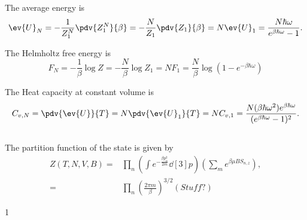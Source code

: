 \documentclass[a4paper,12pt,twoside]{article}
\newcommand{\mcols}{0}
\begin{document}
\begin{multicols*}{2}
The average energy is
\begin{equation}
	\ev{U}_N = -\frac{1}{Z_1^N} \pdv{Z_1^N}{\beta} = -\frac{N}{Z_1} \pdv{Z_1}{\beta} = N\ev{U}_1 = \frac{N\hbar\omega}{e^{\beta\hbar\omega}-1}.
\end{equation}

The Helmholtz free energy is
\begin{equation}
	F_N = -\frac{1}{\beta}\log{Z} = -\frac{N}{\beta}\log{Z_1} = NF_1 = \frac{N}{\beta} \log(1-e^{-\beta\hbar\omega})
\end{equation}

The Heat capacity at constant volume is
\begin{equation}
	C_{v,N} = \pdv{\ev{U}}{T} = N\pdv{\ev{U}_1}{T} = N C_{v,1} =  \frac{N(\beta\hbar\omega^2)e^{\beta\hbar\omega}}{(e^{\beta\hbar\omega}-1)^2}.
\end{equation}

\subsection{}

The partition function of the state is given by
\begin{align}
	Z(T,N,V,B) =& \prod_n \left(\int e^{-\frac{\beta p_n^2}{2m}}\dd[3]{p}\right)\left(\sum_m e^{\beta \mu B S_{n,z}}\right),\\
	=& \prod_n \left(\frac{2\pi m}{\beta}\right)^{3/2}\left( Stuff? \right)
\end{align}


\printBib


\if\mcols1
\end{multicols*}
\fi
\end{document}
